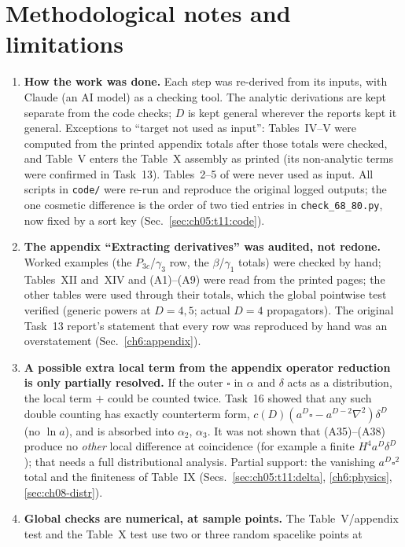 \section{Methodological notes and limitations}
\label{sec:sum-limits}
\begin{enumerate}[leftmargin=18pt,itemsep=2pt]
\item \textbf{How the work was done.} Each step was re-derived from its inputs, with Claude (an AI model) as a checking tool. The analytic
derivations are kept separate from the code checks; $D$ is kept general wherever the reports kept it general. Exceptions to ``target not used as
input'': Tables~IV--V were computed from the printed appendix totals after those totals were checked, and Table~V enters the Table~X assembly as
printed (its non-analytic terms were confirmed in Task~13). Tables~2--5 of \PII{} were never used as input. All scripts in \texttt{code/} were re-run and
reproduce the original logged outputs; the one cosmetic difference is the order of two tied entries in \texttt{check\_68\_80.py}, now fixed by a sort key
(Sec.~\ref{sec:ch05:t11:code}).
\item \textbf{The appendix ``Extracting derivatives'' was audited, not redone.} Worked examples (the $P_{3c}$/$\gamma_3$ row, the $\beta$/$\gamma_1$
totals) were checked by hand; Tables~XII and~XIV and (A1)--(A9) were read from the printed pages; the other tables were used through their totals,
which the global pointwise test verified (generic powers at $D=4,5$; actual $D=4$ propagators). The original Task~13 report's statement that every
row was reproduced by hand was an overstatement (Sec.~\ref{ch6:appendix}).
\item \textbf{A possible extra local term from the appendix operator reduction is only partially resolved.} If the outer $\square$ in $\alpha$ and
$\delta$ acts as a distribution, the local term $+$ could be counted twice. Task~16 showed that any such double counting has exactly
counterterm form, $c(D)(a^D\square-a^{D-2}\nabla^2)\delta^D$ (no $\ln a$), and is absorbed into $\alpha_2$, $\alpha_3$. It was not shown that
(A35)--(A38) produce no \emph{other} local difference at coincidence (for example a finite $H^4a^D\delta^D$); that needs a full distributional analysis.
Partial support: the vanishing $a^D\square^2$ total and the finiteness of Table~IX (Secs.~\ref{sec:ch05:t11:delta}, \ref{ch6:physics},
\ref{sec:ch08-distr}).
\item \textbf{Global checks are numerical, at sample points.} The Table~V/appendix test and the Table~X test use two or three random spacelike points at

\end{enumerate}
